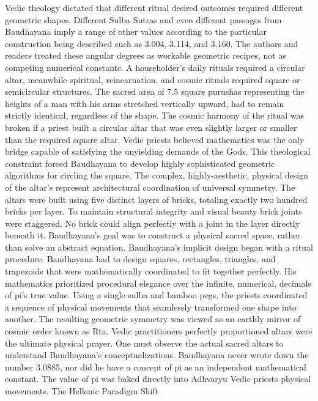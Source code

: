 Vedic theology dictated that different ritual desired outcomes required different geometric shapes. Different Sulba Sutras and even different passages from Baudhayana imply a range of other values according to the particular construction being described such as 3.004, 3.114, and 3.160. The authors and readers treated these angular degrees as workable geometric recipes, not as competing numerical constants. A householder's daily rituals required a circular altar, meanwhile spiritual, reincarnation, and cosmic rituals required square or semicircular structures. The sacred area of 7.5 square purushas representing the heights of a man with his arms stretched vertically upward, had to remain strictly identical, regardless of the shape. The cosmic harmony of the ritual was broken if a priest built a circular altar that was even slightly larger or smaller than the required square altar. Vedic priests believed mathematics was the only bridge capable of satisfying the unyielding demands of the Gods. This theological constraint forced Baudhayana to develop highly sophisticated geometric algorithms for circling the square. The complex, highly-aesthetic, physical design of the altar’s represent architectural coordination of universal symmetry. The altars were built using five distinct layers of bricks, totaling exactly two hundred bricks per layer. To maintain structural integrity and visual beauty brick joints were staggered. No brick could align perfectly with a joint in the layer directly beneath it. Baudhayana’s goal was to construct a physical sacred space, rather than solve an abstract equation.
Baudhayana's implicit design began with a ritual procedure. Baudhayana had to design squares, rectangles, triangles, and trapezoids that were mathematically coordinated to fit together perfectly. His mathematics prioritized procedural elegance over the infinite, numerical, decimals of pi’s true value. Using a single sulba and bamboo pegs, the priests coordinated a sequence of physical movements that seamlessly transformed one shape into another. The resulting geometric symmetry was viewed as an earthly mirror of cosmic order known as Rta. Vedic practitioners perfectly proportioned altars were the ultimate physical prayer. One must observe the actual sacred altars to understand Baudhayana’s conceptualizations. Baudhayana never wrote down the number 3.0885, nor did he have a concept of pi as an independent mathematical constant. The value of pi was baked directly into Adhvaryu Vedic priests physical movements. 
The Hellenic Paradigm Shift
